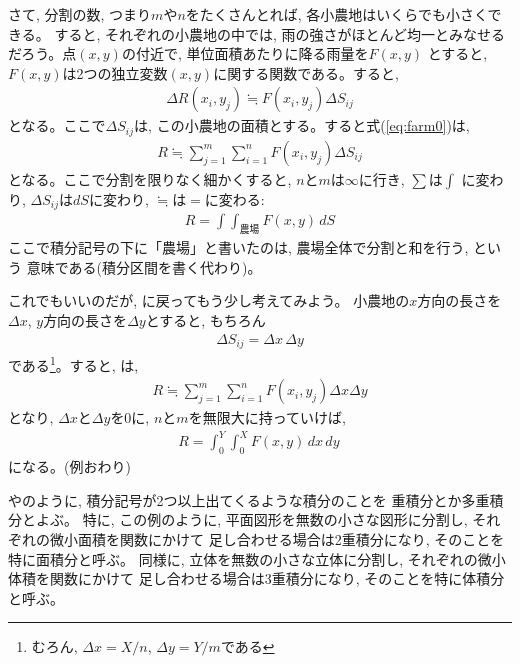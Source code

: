 \begin{exmpl}
さて, 分割の数, つまり$m$や$n$をたくさんとれば, 各小農地はいくらでも小さくできる。
すると, それぞれの小農地の中では, 雨の強さがほとんど均一とみなせる
だろう。点$(x, y)$の付近で, 単位面積あたりに降る雨量を$F(x, y)$
とすると, $F(x, y)$は2つの独立変数$(x, y)$に関する関数である。すると, 
\begin{eqnarray}
\Delta R(x_i, y_j)\fallingdotseq F(x_i, y_j)\Delta S_{ij}\label{eq:farm1}
\end{eqnarray}
となる。ここで$\Delta S_{ij}$は, この小農地の面積とする。すると式(\ref{eq:farm0})は,
\begin{eqnarray}
R\fallingdotseq \sum_{j=1}^{m}\sum_{i=1}^{n}F(x_i, y_j)\Delta S_{ij}\label{eq:farm15}
\end{eqnarray}
となる。ここで分割を限りなく細かくすると, $n$と$m$は$\infty$に行き, $\sum$は$\int$
に変わり, $\Delta S_{ij}$は$dS$に変わり, $\fallingdotseq$は$=$に変わる:
\begin{eqnarray}
R = \int\int_{\text{農場}}F(x, y)\,dS\label{eq:farm2}
\end{eqnarray}
ここで積分記号の下に「農場」と書いたのは, 農場全体で分割と和を行う, という
意味である(積分区間を書く代わり)。

これでもいいのだが, に戻ってもう少し考えてみよう。
小農地の$x$方向の長さを$\Delta x$, $y$方向の長さを$\Delta y$とすると, もちろん
\begin{eqnarray}
\Delta S_{ij}=\Delta x\,\Delta y\label{eq:farm25}
\end{eqnarray}
である\footnote{むろん, $\Delta x=X/n$, $\Delta y=Y/m$である}。すると, は, 
\begin{eqnarray}
R\fallingdotseq \sum_{j=1}^{m}\sum_{i=1}^{n}F(x_i, y_j)\Delta x\Delta y\label{eq:farm3}
\end{eqnarray}
となり, $\Delta x$と$\Delta y$を0に, $n$と$m$を無限大に持っていけば, 
\begin{eqnarray}
R=\int_{0}^{Y}\int_{0}^{X}F(x, y)\,dx\,dy\,\label{eq:farm7}
\end{eqnarray}
になる。(例おわり)\end{exmpl}

やのように, 積分記号が2つ以上出てくるような積分のことを
重積分とか多重積分とよぶ。
特に, この例のように, 平面図形を無数の小さな図形に分割し, それぞれの微小面積を関数にかけて
足し合わせる場合は2重積分になり, そのことを特に面積分と呼ぶ。
同様に, 立体を無数の小さな立体に分割し, それぞれの微小体積を関数にかけて
足し合わせる場合は3重積分になり, そのことを特に体積分と呼ぶ。\\


